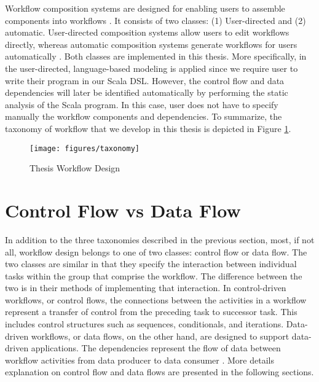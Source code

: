 Workflow composition systems are designed for enabling users to assemble components into workflows \cite{yu2005taxonomy}. It consists of two classes: (1) User-directed and (2) automatic.  User-directed composition systems allow users to edit workflows directly, whereas automatic composition systems generate workflows for users automatically \cite{yu2005taxonomy}. Both classes are implemented in this thesis. More specifically, in the user-directed, language-based modeling is applied since we require user to write their program in our Scala DSL. However, the control flow and data dependencies will later be identified automatically by performing the static analysis of the Scala program. In this case, user does not have to specify manually the workflow components and dependencies. To summarize, the taxonomy of workflow that we develop in this thesis is depicted in Figure \ref{fig:Taxonomy}.

\begin{figure}[here]
\centering
\texttt{[image: figures/taxonomy]}
\caption{Thesis Workflow Design \cite{yu2005taxonomy}}
\label{fig:Taxonomy}
\end{figure}

\section{Control Flow vs Data Flow}
In addition to the three taxonomies described in the previous section, most, if not all, workflow design belongs to one of two classes: control flow or data flow. The two classes are similar in that they specify the interaction between individual tasks within the group that comprise the workflow. The difference between the two is in their methods of implementing that interaction. In control-driven workflows, or control flows, the connections between the activities in a workflow represent a transfer of control from the preceding task to successor task. This includes control structures such as sequences, conditionals, and iterations. Data-driven workflows, or data flows, on the other hand, are designed to support data-driven applications. The dependencies represent the flow of data between workflow activities from data producer to data consumer \cite{deelman2009workflows}. More details explanation on control flow and data flows are presented in the following sections. 

